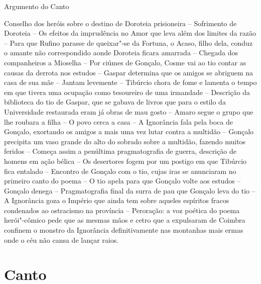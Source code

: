 \movetoevenpage
\mbox{}\vfill
\thispagestyle{empty}
\noindent Argumento do Canto 
\medskip

{\footnotesize\noindent Conselho dos heróis sobre o destino de Doroteia prisioneira --
Sofrimento de Doroteia -- Os efeitos da imprudência no Amor			\index{\Amor}
que leva além dos limites da razão -- Para que Rufino parasse de
queixar"-se da Fortuna, o Acaso, filho dela, conduz o amante não					\index{\Acaso}		\index{\Fortu}
correspondido aonde Doroteia ficara amarrada -- Chegada dos companheiros a Mioselha --
Por ciúmes de Gonçalo, Cosme vai ao tio contar as causas da derrota nos estudos 
-- Gaspar determina que os amigos se abriguem na casa de sua mãe --
Jantam levemente -- Tibúrcio chora de fome e lamenta o tempo em
que tivera uma ocupação como tesoureiro de uma irmandade -- Descrição da biblioteca
do tio de Gaspar, que se gabava de livros que para o estilo da Universidade restaurada
eram já obras de mau gosto -- Amaro segue o grupo que lhe roubara a filha -- O povo
cerca a casa -- A Ignorância fala pela boca de Gonçalo, exortando os amigos
a mais uma vez lutar contra a multidão -- Gonçalo precipita um vaso grande
do alto do sobrado sobre a multidão, fazendo muitos feridos -- Começa assim a penúltima
pragmatografia de guerra, descrição de homens em ação bélica -- Os desertores
fogem por um postigo em que Tibúrcio fica entalado -- Encontro de Gonçalo com o tio,
cujas iras se anunciaram no primeiro canto do poema -- O tio apela para que Gonçalo
volte aos estudos -- Gonçalo denega -- Pragmatografia final da surra de pau que Gonçalo
leva do tio -- A Ignorância goza o Império que ainda tem sobre aqueles espíritos fracos
condenados ao ostracismo na província -- Peroração: a voz poética do poema
herói"-cômico pede que as mesmas mãos e cetro que a expulsaram de Coimbra confinem
o monstro da Ignorância definitivamente nas montanhas mais ermas onde o céu
não cansa de lançar raios. }


\chapter{Canto } 

